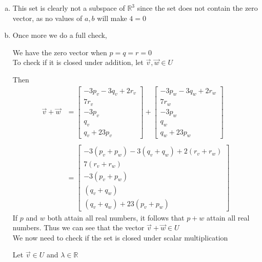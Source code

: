 \documentclass{article}
\begin{document}
\begin{enumerate}[(a)]
    \item This set is clearly not a subspace of \(\mathbb{R}^3\) since the set does not contain the zero vector,
    as no values of \(a,b\) will make \(4 = 0\)

    \item Once more we do a full check,
    
    We have the zero vector when \(p= q =r = 0\)\\
    
    To check if it is closed under addition, let \(\vec{v}, \vec{w} \in U\)

    Then
    \begin{align*}
    \vec{v} + \vec{w} &= \begin{bmatrix}
        -3p_v - 3q_v + 2r_v \\
        7r_v \\
        -3p_v \\
        q_v \\
        q_v + 23p_v 
    \end{bmatrix} + \begin{bmatrix}
        -3p_w - 3q_w + 2r_w \\
        7r_w \\
        -3p_w \\
        q_w \\
        q_w + 23p_w 
    \end{bmatrix} \\
    \\
    & = \begin{bmatrix}
        -3(p_v+p_w) - 3(q_v+q_w) + 2(r_v + r_w) \\
        7(r_v +r_w) \\
        -3(p_v+p_w) \\
        (q_v + q_w) \\
        (q_v + q_w) + 23(p_v + p_w) 
    \end{bmatrix}
    \end{align*}
    If \(p\) and \(w\) both attain all real numbers, it follows that
    \(p + w\) attain all real numbers.
    Thus we can see that the vector \(\vec{v} + \vec{w} \in U\) 
    \\

    We now need to check if the set is closed under scalar multiplication

    Let \(\vec{v} \in U\) and \(\lambda \in \mathbb{R}\)


\end{enumerate}
\end{document}
